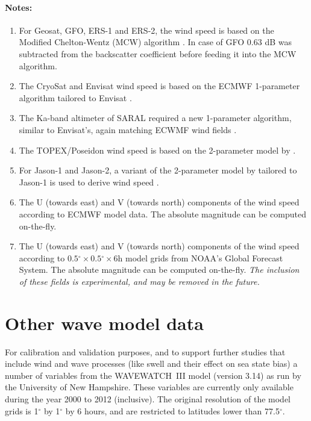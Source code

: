 \documentclass[a4paper,11pt,openany,natbib,nomargin]{thesis}
\renewcommand\deg{\ensuremath{^\circ}}
\newenvironment{notes}[1][Notes:]{\FloatBarrier\paragraph{#1}\begin{enumerate}}{\end{enumerate}}
\begin{document}
\begin{notes}
\item For Geosat, GFO, ERS-1 and ERS-2, the wind speed is based on the Modified Chelton-Wentz (MCW) algorithm \citep{witter1991}. In case of GFO 0.63 dB was subtracted from the backscatter coefficient before feeding it into the MCW algorithm.\label{item:wind_speed_mcw}
\item The CryoSat and Envisat wind speed is based on the ECMWF 1-parameter algorithm tailored to Envisat \citep{abdalla2007}.\label{item:wind_speed_abdalla}
\item The Ka-band altimeter of SARAL required a new 1-parameter algorithm, similar to Envisat's, again matching ECWMF wind fields \citep{lillibridge2014}.\label{item:wind_speed_saral}
\item The TOPEX/Poseidon wind speed is based on the 2-parameter model by \citet{gourrion2002b}.\label{item:wind_speed_topex}
\item For Jason-1 and Jason-2, a variant of the 2-parameter model by \citet{gourrion2002b} tailored to Jason-1 is used to derive wind speed \citep{collard2005}.\label{item:wind_speed_jason}
\item The U (towards east) and V (towards north) components of the wind speed according to ECMWF model data. The absolute magnitude can be computed on-the-fly.\label{item:wind_speed_ecmwf}
\item The U (towards east) and V (towards north) components of the wind speed according to $0.5\deg\times0.5\deg\times6$h model grids from NOAA's Global Forecast System. The absolute magnitude can be computed on-the-fly. \emph{The inclusion of these fields is experimental, and may be removed in the future.}\label{item:wind_speed_gfs}
\end{notes}

\section{Other wave model data}
\label{var:wave}
For calibration and validation purposes, and to support further studies that include wind and wave processes (like swell and their effect on sea state bias) a number of variables from the WAVEWATCH~III model (version 3.14) \citep{tolman2009} as run by the University of New Hampshire. These variables are currently only available during the year 2000 to 2012 (inclusive). The original resolution of the model grids is 1$\deg$ by 1$\deg$ by 6 hours, and are restricted to latitudes lower than 77.5$\deg$.
\end{document}
